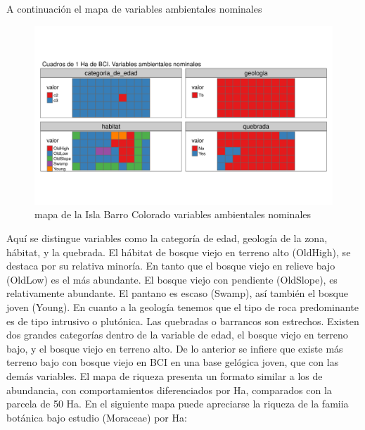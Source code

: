 \documentclass[11pt,]{article}
\begin{document}
A continuación el mapa de variables ambientales nominales

\begin{figure}
\centering
\includegraphics[width=1.00000\textwidth]{mapas_variables_ambientales_nominales_tmap.png}
\caption{mapa de la Isla Barro Colorado variables ambientales nominales
\label{fig:bci_map}}
\end{figure}

Aquí se distingue variables como la categoría de edad, geología de la
zona, hábitat, y la quebrada. El hábitat de bosque viejo en terreno alto
(OldHigh), se destaca por su relativa minoría. En tanto que el bosque
viejo en relieve bajo (OldLow) es el más abundante. El bosque viejo con
pendiente (OldSlope), es relativamente abundante. El pantano es escaso
(Swamp), así también el bosque joven (Young). En cuanto a la geología
tenemos que el tipo de roca predominante es de tipo intrusivo o
plutónica. Las quebradas o barrancos son estrechos. Existen dos grandes
categorías dentro de la variable de edad, el bosque viejo en terreno
bajo, y el bosque viejo en terreno alto. De lo anterior se infiere que
existe más terreno bajo con bosque viejo en BCI en una base gelógica
joven, que con las demás variables. El mapa de riqueza presenta un
formato similar a los de abundancia, con comportamientos diferenciados
por Ha, comparados con la parcela de 50 Ha. En el siguiente mapa puede
apreciarse la riqueza de la famiia botánica bajo estudio (Moraceae) por
Ha:
\end{document}
